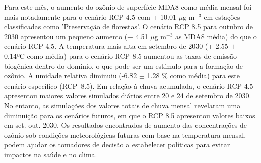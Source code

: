 \begin{spacing}{1.5}
			Para este mês, o aumento do ozônio de superfície MDA8 como média mensal foi mais notadamente para o cenário RCP 4.5 com + 10.01 $\mu$g m$^{-3}$ em estações classificadas como 'Preservação de florestas'. O cenário RCP 8.5 para outubro de 2030 apresentou um pequeno aumento (+ 4.51 $\mu$g m$^{-3}$ as MDA8 média) do que o cenário RCP 4.5. A temperatura mais alta em setembro de 2030 (+ 2.55 $\pm$ 0.14ºC como média) para o cenário RCP 8.5 aumentou as taxas de emissão biogênica dentro do domínio, o que pode ser um estímulo para a formação de ozônio. A umidade relativa diminuiu (-6.82 $\pm$ 1.28 \% como média) para este cenário específico (RCP~8.5). Em relação à chuva acumulada, o cenário RCP 4.5 apresentou maiores valores simulados diários entre 20 e 24 de setembro de 2030. No entanto, as simulações dos valores totais de chuva mensal revelaram uma diminuição para os cenários futuros, em que o RCP 8.5 apresentou valores baixos em set.-out. 2030.
			Os resultados encontrados de aumento das concentrações de ozônio sob condições meteorológicas futuras com base na temperatura mensal, podem ajudar os tomadores de decisão a estabelecer políticas para evitar impactos na saúde e no clima.
		\cleardoublepage
	
		\thispagestyle{empty} \tableofcontents \cleardoublepage

		\thispagestyle{empty} \listoftables \cleardoublepage	
		
		\thispagestyle{empty} \listoffigures \cleardoublepage	
	\mainmatter
	\pagestyle{mainmatter}
		
		
		
		

	
	
	 \clearpage

	\begin{appendix}
		
	\end{appendix}
	
\end{spacing}


